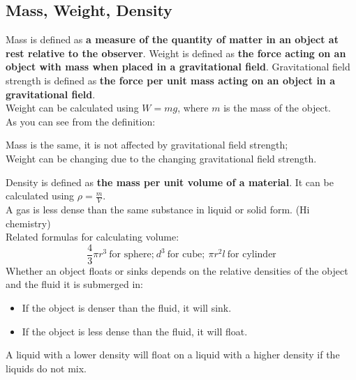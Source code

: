 \documentclass[a4paper,12pt]{article}
\begin{document}
\subsection{Mass, Weight, Density}
Mass is defined as \textbf{a measure of the quantity of matter in an object at rest relative to the observer}. Weight is defined as \textbf{the force acting on an object with mass when placed in a gravitational field}. Gravitational field strength is defined as \textbf{the force per unit mass acting on an object in a gravitational field}.\\
Weight can be calculated using \(W=mg\), where \(m\) is the mass of the object.\\
As you can see from the definition:
\begin{center}
Mass is the same, it is not affected by gravitational field strength;\\
Weight can be changing due to the changing gravitational field strength.\\
\end{center}
Density is defined as \textbf{the mass per unit volume of a material}. It can be calculated using \(\rho = \frac{m}{V}\).\\
A gas is less dense than the same substance in liquid or solid form. (Hi chemistry)\\
Related formulas for calculating volume:
\[\frac{4}3 \pi r^3\ \text{for sphere;}\ d^3\ \text{for cube};\ \pi r^2l\ \text{for cylinder}\]
Whether an object floats or sinks depends on the relative densities of the object and the fluid it is submerged in:
\begin{itemize}
\item If the object is denser than the fluid, it will sink.
\item If the object is less dense than the fluid, it will float.
\end{itemize}
A liquid with a lower density will float on a liquid with a higher density if the liquids do not mix.
\end{document}
